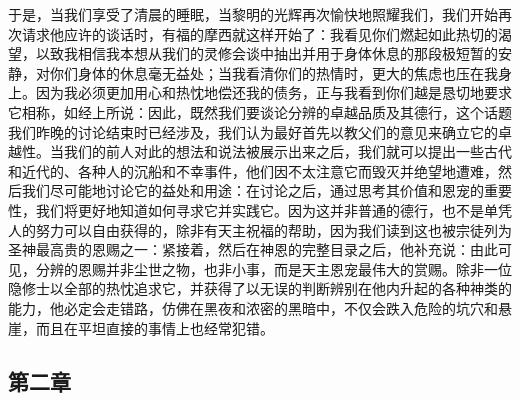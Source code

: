 于是，当我们享受了清晨的睡眠，当黎明的光辉再次愉快地照耀我们，我们开始再次请求他应许的谈话时，有福的摩西就这样开始了：我看见你们燃起如此热切的渴望，以致我相信我本想从我们的灵修会谈中抽出并用于身体休息的那段极短暂的安静，对你们身体的休息毫无益处；当我看清你们的热情时，更大的焦虑也压在我身上。因为我必须更加用心和热忱地偿还我的债务，正与我看到你们越是恳切地要求它相称，如经上所说：因此，既然我们要谈论分辨的卓越品质及其德行，这个话题我们昨晚的讨论结束时已经涉及，我们认为最好首先以教父们的意见来确立它的卓越性。当我们的前人对此的想法和说法被展示出来之后，我们就可以提出一些古代和近代的、各种人的沉船和不幸事件，他们因不太注意它而毁灭并绝望地遭难，然后我们尽可能地讨论它的益处和用途：在讨论之后，通过思考其价值和恩宠的重要性，我们将更好地知道如何寻求它并实践它。因为这并非普通的德行，也不是单凭人的努力可以自由获得的，除非有天主祝福的帮助，因为我们读到这也被宗徒列为圣神最高贵的恩赐之一：紧接着，然后在神恩的完整目录之后，他补充说：由此可见，分辨的恩赐并非尘世之物，也非小事，而是天主恩宠最伟大的赏赐。除非一位隐修士以全部的热忱追求它，并获得了以无误的判断辨别在他内升起的各种神类的能力，他必定会走错路，仿佛在黑夜和浓密的黑暗中，不仅会跌入危险的坑穴和悬崖，而且在平坦直接的事情上也经常犯错。\par


\subsection{第二章}

\par


